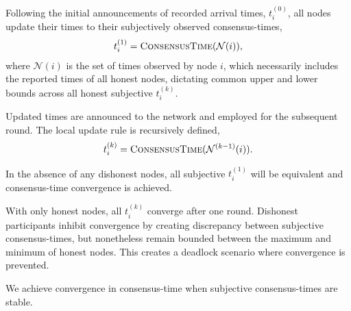 Following the initial announcements of recorded arrival times, $t_i^{(0)}$, all nodes update their times to their subjectively observed consensus-times,
\begin{align}
	t_i^{(1)} = \textsc{ConsensusTime}(\mathcal{N}(i)),
\end{align}
where $\mathcal{N}(i)$ is the set of times observed by node $i$, which necessarily includes the reported times of all honest nodes, dictating common upper and lower bounds across all honest subjective $t_i^{(k)}$.

Updated times are announced to the network and employed for the subsequent round. The local update rule is recursively defined,
\begin{align}
	t_i^{(k)} = \textsc{ConsensusTime}(\mathcal{N}^{(k-1)}(i)).
\end{align}

In the absence of any dishonest nodes, all subjective $t_i^{(1)}$ will be equivalent and consensus-time convergence is achieved.

With only honest nodes, all $t_i^{(k)}$ converge after one round. Dishonest participants inhibit convergence by creating discrepancy between subjective consensus-times, but nonetheless remain bounded between the maximum and minimum of honest nodes. This creates a deadlock scenario where convergence is prevented.




We achieve convergence in consensus-time when subjective consensus-times are stable. 


%
%

